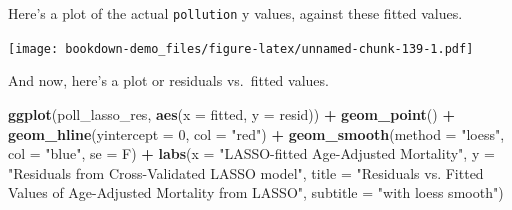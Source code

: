 \documentclass[]{book}
\newenvironment{Shaded}{\begin{snugshade}}{\end{snugshade}}
\newcommand{\KeywordTok}[1]{\textcolor[rgb]{0.13,0.29,0.53}{\textbf{#1}}}
\newcommand{\DataTypeTok}[1]{\textcolor[rgb]{0.13,0.29,0.53}{#1}}
\newcommand{\DecValTok}[1]{\textcolor[rgb]{0.00,0.00,0.81}{#1}}
\newcommand{\StringTok}[1]{\textcolor[rgb]{0.31,0.60,0.02}{#1}}
\newcommand{\OperatorTok}[1]{\textcolor[rgb]{0.81,0.36,0.00}{\textbf{#1}}}
\newcommand{\NormalTok}[1]{#1}
\theoremstyle{definition}
\theoremstyle{definition}
\theoremstyle{definition}
\theoremstyle{remark}
\begin{document}
Here's a plot of the actual \texttt{pollution} y values, against these
fitted values.

\begin{Shaded}
\end{Shaded}

\texttt{[image: bookdown-demo\_files/figure-latex/unnamed-chunk-139-1.pdf]}

And now, here's a plot or residuals vs.~fitted values.

\begin{Shaded}
\begin{Highlighting}[]
\KeywordTok{ggplot}\NormalTok{(poll_lasso_res, }\KeywordTok{aes}\NormalTok{(}\DataTypeTok{x =}\NormalTok{ fitted, }\DataTypeTok{y =}\NormalTok{ resid)) }\OperatorTok{+}\StringTok{ }
\StringTok{    }\KeywordTok{geom_point}\NormalTok{() }\OperatorTok{+}\StringTok{ }
\StringTok{    }\KeywordTok{geom_hline}\NormalTok{(}\DataTypeTok{yintercept =} \DecValTok{0}\NormalTok{, }\DataTypeTok{col =} \StringTok{"red"}\NormalTok{) }\OperatorTok{+}
\StringTok{    }\KeywordTok{geom_smooth}\NormalTok{(}\DataTypeTok{method =} \StringTok{"loess"}\NormalTok{, }\DataTypeTok{col =} \StringTok{"blue"}\NormalTok{, }\DataTypeTok{se =}\NormalTok{ F) }\OperatorTok{+}
\StringTok{    }\KeywordTok{labs}\NormalTok{(}\DataTypeTok{x =} \StringTok{"LASSO-fitted Age-Adjusted Mortality"}\NormalTok{,}
         \DataTypeTok{y =} \StringTok{"Residuals from Cross-Validated LASSO model"}\NormalTok{,}
         \DataTypeTok{title =} \StringTok{"Residuals vs. Fitted Values of Age-Adjusted Mortality from LASSO"}\NormalTok{,}
         \DataTypeTok{subtitle =} \StringTok{"with loess smooth"}\NormalTok{)}
\end{Highlighting}
\end{Shaded}
\end{document}
